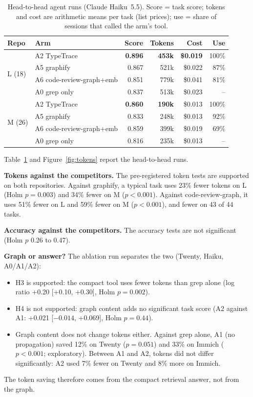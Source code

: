 \documentclass[sigconf,nonacm]{acmart}
\newcommand{\tool}{TypeTrace\xspace}
\newcommand{\gfy}{graphify\xspace}
\newcommand{\crg}{code-review-graph\xspace}
\newcommand{\cmp}{\textsf{compact}\xspace}
\begin{document}
\begin{table}[t]
\caption{Head-to-head agent runs (Claude Haiku~5.5). Score = task score; tokens and cost are arithmetic means per task (list prices); use = share of sessions that called the arm's tool.}
\label{tab:agent}
\small
\begin{tabular}{@{}llrrrr@{}}
\toprule
Repo & Arm & Score & Tokens & Cost & Use \\
\midrule
\multirow{4}{*}{L (18)} & A2 \tool & \textbf{0.896} & \textbf{453k} & \textbf{\$0.019} & 100\% \\
 & A5 \gfy & 0.867 & 521k & \$0.022 & 87\% \\
 & A6 \crg +emb & 0.851 & 779k & \$0.041 & 81\% \\
 & A0 grep only & 0.837 & 513k & \$0.023 & -- \\
\midrule
\multirow{4}{*}{M (26)} & A2 \tool & \textbf{0.860} & \textbf{190k} & \$0.013 & 100\% \\
 & A5 \gfy & 0.833 & 248k & \$0.013 & 92\% \\
 & A6 \crg +emb & 0.859 & 399k & \$0.019 & 69\% \\
 & A0 grep only & 0.816 & 235k & \$0.013 & -- \\
\bottomrule
\end{tabular}
\end{table}

Table~\ref{tab:agent} and Figure~\ref{fig:tokens} report the head-to-head runs.

\textbf{Tokens against the competitors.} The pre-registered token tests are supported on both repositories. Against \gfy, a typical task uses 23\% fewer tokens on L (Holm $p = 0.003$) and 34\% fewer on M ($p < 0.001$). Against \crg, it uses 51\% fewer on L and 59\% fewer on M ($p < 0.001$), and fewer on 43 of 44 tasks.

\textbf{Accuracy against the competitors.} The accuracy tests are not significant (Holm $p$ 0.26 to 0.47).

\textbf{Graph or answer?} The ablation run separates the two (Twenty, Haiku, A0/A1/A2):
\begin{itemize}
\item H3 is supported: the \cmp tool uses fewer tokens than grep alone (log ratio +0.20 [+0.10, +0.30], Holm $p = 0.002$).
\item H4 is not supported: graph content adds no significant task score (A2 against A1: +0.021 [$-0.014$, +0.069], Holm $p = 0.44$).
\item Graph content does not change tokens either. Against grep alone, A1 (no propagation) saved 12\% on Twenty ($p = 0.051$) and 33\% on Immich ($p < 0.001$; exploratory). Between A1 and A2, tokens did not differ significantly: A2 used 7\% fewer on Twenty and 8\% more on Immich.
\end{itemize}
The token saving therefore comes from the compact retrieval answer, not from the graph.
\end{document}
